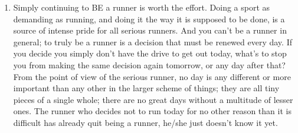 \begin{enumerate}
    \item Simply continuing to BE a runner is worth the effort. Doing a sport as demanding as running, and doing it the way it is supposed to be done, is a source of intense pride for all serious runners. And you can't be a runner in general; to truly be a runner is a decision that must be renewed every day. If you decide you simply don't have the drive to get out today, what's to stop you from making the same decision again tomorrow, or any day after that? From the point of view of the serious runner, no day is any different or more important than any other in the larger scheme of things; they are all tiny pieces of a single whole; there are no great days without a multitude of lesser ones. The runner who decides not to run today for no other reason than it is difficult has already quit being a runner, he/she just doesn't know it yet.

\end{enumerate}
